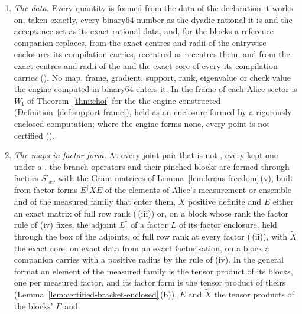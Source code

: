 \begin{requirement}
\begin{enumerate}[label=(\roman*),leftmargin=2.4em]
  (), and each Choi block as the exact
  Hermitian part of the dyadic matrix its binary64 entries are.
\item \emph{The data.} Every quantity is formed from the data of the
  declaration it works on, taken exactly, every binary64 number as the dyadic
  rational it is and the acceptance set as its exact rational data, and, for
  the blocks a reference companion replaces, from the exact centres and radii
  of the entrywise enclosures its compilation carries, recentred as
   recentres them, and from the
  exact centres and radii of the  and the exact core of
  every  its compilation carries
  (). No map, frame,
  gradient, support, rank, eigenvalue or check value the engine computed in
  binary64 enters it. In  the frame of each Alice
  sector is $W_{\mathsf t}$ of Theorem~\ref{thm:choi} for the
   the engine constructed
  (Definition~\ref{def:support-frame}), held as an enclosure formed by a
  rigorously enclosed computation; where the engine forms none, every point
  is not certified ().
\item \emph{The maps in factor form.} At every joint pair that is not
  , every kept one under a , the branch
  operators and their pinched blocks are formed through factors
  $S'_{xv}$ with the Gram matrices of
  Lemma~\ref{lem:kraus-freedom}\,(v), built from factor forms
  $E^{\dagger}\widetilde XE$ of the elements of Alice's measurement or
  ensemble and of the measured family that enter them, $\widetilde X$
  positive definite and $E$ either an exact matrix of full row rank
  (\,(iii)) or, on a
  block whose rank the factor rule of (iv) fixes, the adjoint $L^{\dagger}$
  of a factor $L$ of its factor enclosure, held through the box of the
  adjoints, of full row rank at every factor
  (\,(ii)), with
  $\widetilde X$ the exact core: on exact data from an exact factorisation,
  on a block a companion carries with a positive radius by the rule of (iv).
  In the general format an element of the measured family is the tensor
  product of its blocks, one per measured factor, and its factor form is
  the tensor product of theirs (Lemma~\ref{lem:certified-bracket-enclosed}\,(b)),
  $E$ and $\widetilde X$ the tensor products of the blocks' $E$ and

\end{enumerate}
\end{requirement}
